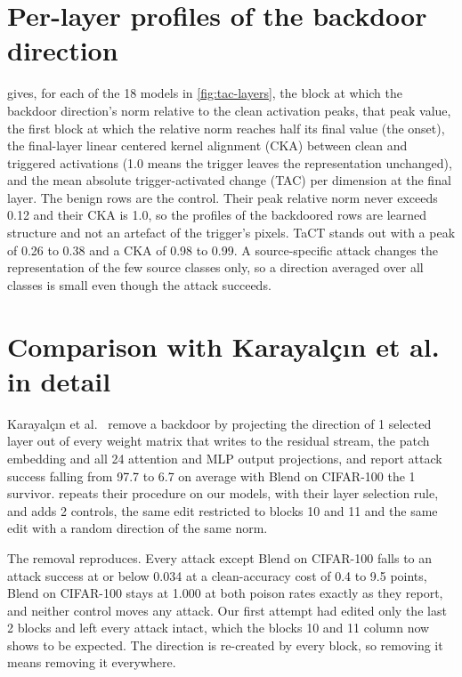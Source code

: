 \section{Per-layer profiles of the backdoor direction}
\label{app:layers}

 gives, for each of the 18 models in \cref{fig:tac-layers}, the block at which the backdoor direction's norm relative to the clean activation peaks, that peak value, the first block at which the relative norm reaches half its final value (the onset), the final-layer linear centered kernel alignment (CKA) \cite{kornblith2019cka} between clean and triggered activations (1.0 means the trigger leaves the representation unchanged), and the mean absolute trigger-activated change (TAC) per dimension at the final layer. The benign rows are the control. Their peak relative norm never exceeds 0.12 and their CKA is 1.0, so the profiles of the backdoored rows are learned structure and not an artefact of the trigger's pixels. TaCT stands out with a peak of 0.26 to 0.38 and a CKA of 0.98 to 0.99. A source-specific attack changes the representation of the few source classes only, so a direction averaged over all classes is small even though the attack succeeds.


\FloatBarrier

\section{Comparison with Karayal\c{c}{\i}n et al. in detail}
\label{app:picek}

Karayal\c{c}{\i}n et al.~\cite{karayalcin2026backdoor} remove a backdoor by projecting the direction of 1 selected layer out of every weight matrix that writes to the residual stream, the patch embedding and all 24 attention and MLP output projections, and report attack success falling from 97.7 to 6.7 on average with Blend on CIFAR-100 the 1 survivor.  repeats their procedure on our models, with their layer selection rule, and adds 2 controls, the same edit restricted to blocks 10 and 11 and the same edit with a random direction of the same norm.

\FloatBarrier

The removal reproduces. Every attack except Blend on CIFAR-100 falls to an attack success at or below 0.034 at a clean-accuracy cost of 0.4 to 9.5 points, Blend on CIFAR-100 stays at 1.000 at both poison rates exactly as they report, and neither control moves any attack. Our first attempt had edited only the last 2 blocks and left every attack intact, which the blocks 10 and 11 column now shows to be expected. The direction is re-created by every block, so removing it means removing it everywhere.

